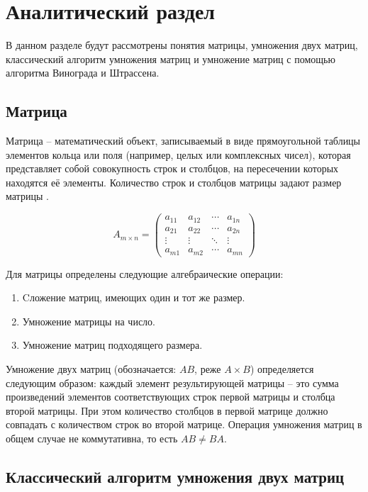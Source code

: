 \chapter{Аналитический раздел}

В данном разделе будут рассмотрены понятия матрицы, умножения двух матриц, классический алгоритм умножения матриц и умножение матриц с помощью алгоритма Винограда и Штрассена.

\section{Матрица}

Матрица -- математический объект, записываемый в виде прямоугольной таблицы элементов кольца или поля (например, целых или комплексных чисел), которая представляет собой совокупность строк и столбцов, на пересечении которых находятся её элементы. Количество строк и столбцов матрицы задают размер матрицы \cite{Mtr}.


\begin{equation*}
	A_{m \times n} =
	\begin{pmatrix}
		a_{11} & a_{12} & \cdots & a_{1n} \\
		a_{21} & a_{22} & \cdots & a_{2n} \\
		\vdots  & \vdots  & \ddots & \vdots  \\
		a_{m1} & a_{m2} & \cdots & a_{mn}
	\end{pmatrix}
\end{equation*}

Для матрицы определены  следующие алгебраические операции: 

\begin{enumerate}[label={\arabic*)}]
	\item Cложение матриц, имеющих один и тот же размер.
	\item Умножение матрицы на число.
	\item Умножение матриц подходящего размера.
\end{enumerate}

Умножение двух матриц (обозначается: $AB$, реже $A \times B$) определяется следующим образом: каждый элемент результирующей матрицы -- это сумма произведений элементов соответствующих строк первой матрицы и столбца второй матрицы. При этом количество столбцов в первой матрице должно совпадать с количеством строк во второй матрице. Операция умножения матриц в общем случае не коммутативна, то есть $AB \neq BA$.

\section{Классический алгоритм умножения двух матриц}

